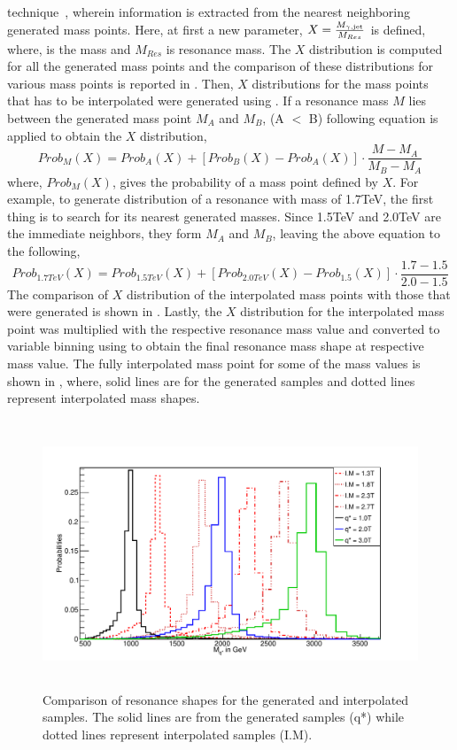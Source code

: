 technique~\cite{Interpolation}, wherein information is extracted from the nearest neighboring generated mass points. Here, at first a new 
parameter, $X = \frac{M_{\gamma, \mathrm{jet}}}{M_{Res}}$ is defined, where, \mgamjet  is the \gamjet mass and $M_{Res}$ is resonance mass. The $X$ distribution 
is computed for all the generated \qstar mass points and the comparison of these distributions for various \qstar mass points is reported in 
\fig{\ref{fig:XDistGen}}. Then, $X$ distributions for the mass points that has to be interpolated were generated using \eqn{\ref{eq:interpolation}}. 
If a resonance mass $M$ lies between the generated mass point $M_{A}$ and $M_{B}$, (A $<$ B) following equation is applied to obtain the $X$ distribution,
\begin{equation}\label{eq:interpolation}
Prob_{M}(X) = Prob_{A}(X) + [ Prob_{B}(X) - Prob_{A}(X) ] \cdot \frac{M - M_{A}}{M_{B} - M_{A}}
\end{equation}
where, $Prob_M(X)$, gives the probability of a mass point defined by $X$. For example, to generate distribution of a resonance with mass of
1.7\unit{TeV}, the first thing is to search for its nearest generated masses. Since 1.5\unit{TeV} and 2.0\unit{TeV} are the immediate neighbors, they 
form $M_{A}$ and $M_{B}$, leaving the above equation to the following,
\begin{equation}
Prob_{1.7\unit{TeV}}(X) = Prob_{1.5TeV}(X) + [ Prob_{2.0TeV}(X) - Prob_{1.5}(X) ] \cdot \frac{1.7 - 1.5}{2.0 - 1.5} 
\end{equation}
The comparison of $X$ distribution of the interpolated mass points with those that were generated is shown in \fig{\ref{fig:XDistInt}}. Lastly, 
the $X$ distribution for the interpolated mass point was multiplied with the respective resonance mass value and converted to variable \gamjet 
binning using \eqn{\ref{eqn:massBin}} to obtain the final \qstar resonance mass shape at respective mass value. The fully interpolated mass 
point for some of the mass values is shown in \fig{\ref{fig:ComGenIP}}, where, solid lines are for the generated samples and dotted lines represent
interpolated mass shapes. 
\begin{figure}[h!]
\centering
 \includegraphics[width=15cm,height=8cm]{ch5/plots/InterpolationPlots/InterpolatedSample.pdf}
 \caption{Comparison of \qstar resonance shapes for the generated and interpolated samples. The solid lines are from the generated samples (q*) while 
dotted lines represent interpolated samples (I.M).}
 \label{fig:ComGenIP}
\end{figure}
